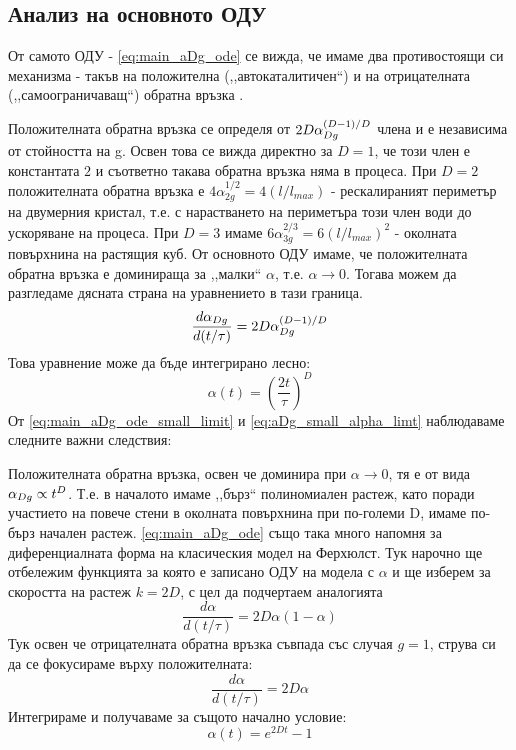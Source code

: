 \subsection{Анализ на основното ОДУ}
От самото ОДУ - \autoref{eq:main_aDg_ode} се вижда, че имаме два противостоящи си механизма - такъв на положителна (,,автокаталитичен``) и на отрицателната (,,самоограничаващ``) обратна връзка \cite{SMDGarxiv}. 

Положителната обратна връзка се определя от $2D\alpha_{Dg}^{(D-1)/D}$ члена и е независима от стойността на g. Освен това се вижда директно за $D = 1$, че този член е константата $2$ и съответно такава обратна връзка няма в процеса. При $D = 2$ положителната обратна връзка е $4\alpha_{2g}^{1/2} = 4 (l/l_{max})$ - рескалираният периметър на двумерния кристал, т.е. с нарастването на периметъра този член води до ускоряване на процеса. При $D = 3$ имаме  $6\alpha_{3g}^{2/3} = 6 (l/l_{max})^2$ - околната повърхнина на растящия куб. От основното ОДУ имаме, че положителната обратна връзка е доминираща за ,,малки`` $\alpha$, т.е. $\alpha \rightarrow 0$. Тогава можем да разгледаме дясната страна на уравнението в тази граница. 
\begin{equation}
	\label{eq:main_aDg_ode_small_limit}
	\frac{d\alpha_{Dg}}{d(t/\tau)} = 2D\alpha_{Dg}^{(D-1)/D}
\end{equation}
Това уравнение може да бъде интегрирано лесно:
\begin{equation}
	\label{eq:aDg_small_alpha_limt}
	\alpha(t) = \left(\frac{2t}{\tau}\right)^D
\end{equation}
От \autoref{eq:main_aDg_ode_small_limit} и \autoref{eq:aDg_small_alpha_limt} наблюдаваме следните важни следствия:

Положителната обратна връзка, освен че доминира при $\alpha \rightarrow 0$, тя е от вида $\alpha_{Dg} \propto t^D$. Т.е. в началото имаме ,,бърз`` полиномиален растеж, като поради участието на повече стени в околната повърхнина при по-големи D, имаме по-бърз начален растеж.
\autoref{eq:main_aDg_ode} също така много напомня за диференциалната форма на класическия модел на Ферхюлст. Тук нарочно ще отбележим функцията за която е записано ОДУ на модела с $\alpha$ и ще изберем за скоростта на растеж $k = 2D$, с цел да подчертаем аналогията 
\begin{equation}
	\frac{d\alpha}{d(t/\tau)} = 2D\alpha (1-\alpha)
\end{equation}
Тук освен че отрицателната обратна връзка съвпада със случая $g = 1$, струва си да се фокусираме върху положителната:
\begin{equation*}
	\frac{d\alpha}{d(t/\tau)} = 2D \alpha
\end{equation*}
Интегрираме и получаваме за същото начално условие:
\begin{equation*}
	\alpha(t) = e^{2Dt} - 1
\end{equation*}

